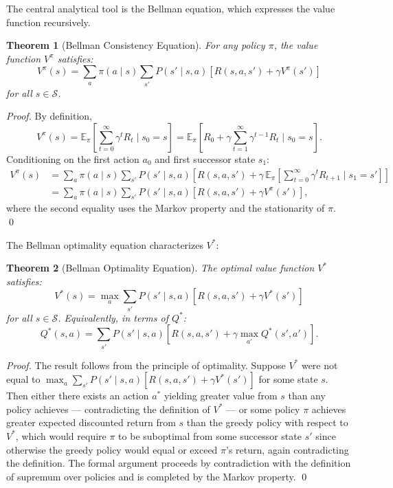 \documentclass[12pt, a4paper, openany]{book}
\theoremstyle{plain}
\newtheorem{theorem}{Theorem}[chapter]
\theoremstyle{definition}
\theoremstyle{remark}
\begin{document}
The central analytical tool is the Bellman equation, which expresses the value function recursively.

\begin{theorem}[Bellman Consistency Equation]
For any policy $\pi$, the value function $V^\pi$ satisfies:
\[
V^\pi(s) = \sum_a \pi(a \mid s) \sum_{s'} P(s' \mid s, a)\left[R(s,a,s') + \gamma V^\pi(s')\right]
\]
for all $s \in \mathcal{S}$.
\end{theorem}

\begin{proof}
By definition,
\[
V^\pi(s) = \mathbb{E}_\pi\!\left[\sum_{t=0}^\infty \gamma^t R_t \;\Big|\; s_0 = s\right]
= \mathbb{E}_\pi\!\left[R_0 + \gamma \sum_{t=1}^\infty \gamma^{t-1} R_t \;\Big|\; s_0 = s\right].
\]
Conditioning on the first action $a_0$ and first successor state $s_1$:
\begin{align*}
V^\pi(s) &= \sum_a \pi(a \mid s) \sum_{s'} P(s' \mid s, a)\left[R(s,a,s') + \gamma\,\mathbb{E}_\pi\!\left[\sum_{t=0}^\infty \gamma^t R_{t+1} \;\Big|\; s_1 = s'\right]\right]\\
&= \sum_a \pi(a \mid s) \sum_{s'} P(s' \mid s, a)\left[R(s,a,s') + \gamma V^\pi(s')\right],
\end{align*}
where the second equality uses the Markov property and the stationarity of $\pi$. \qed
\end{proof}

The Bellman optimality equation characterizes $V^*$:

\begin{theorem}[Bellman Optimality Equation]
The optimal value function $V^*$ satisfies:
\[
V^*(s) = \max_a \sum_{s'} P(s' \mid s, a)\left[R(s,a,s') + \gamma V^*(s')\right]
\]
for all $s \in \mathcal{S}$. Equivalently, in terms of $Q^*$:
\[
Q^*(s,a) = \sum_{s'} P(s' \mid s, a)\left[R(s,a,s') + \gamma \max_{a'} Q^*(s',a')\right].
\]
\end{theorem}

\begin{proof}
The result follows from the principle of optimality. Suppose $V^*$ were not equal to $\max_a \sum_{s'} P(s' \mid s, a)[R(s,a,s') + \gamma V^*(s')]$ for some state $s$. Then either there exists an action $a^*$ yielding greater value from $s$ than any policy achieves --- contradicting the definition of $V^*$ --- or some policy $\pi$ achieves greater expected discounted return from $s$ than the greedy policy with respect to $V^*$, which would require $\pi$ to be suboptimal from some successor state $s'$ since otherwise the greedy policy would equal or exceed $\pi$'s return, again contradicting the definition. The formal argument proceeds by contradiction with the definition of supremum over policies and is completed by the Markov property. \qed
\end{proof}
\end{document}
